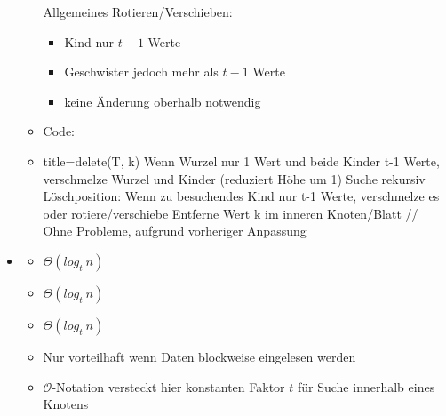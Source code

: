 \documentclass[
    12pt,
    a4paper,
    ngerman,
    color=3b,%
    marginpar=false,
    colorback=false,
    leqno,
]{tudaexercise}
\begin{document}
\begin{itemize}
\begin{itemize}
\begin{minipage}{0.25\textwidth}
                    \end{minipage}
                    \begin{minipage}{0.65\textwidth}
                        Allgemeines Rotieren/Verschieben:
                        \begin{itemize}
                            \item Kind nur $t-1$ Werte
                            \item Geschwister jedoch mehr als $t-1$ Werte
                            \item keine Änderung oberhalb notwendig
                        \end{itemize}
                    \end{minipage}
                \clearpage
                    \item Code:
                \item[]
                    \begin{ccode}[autogobble]{title={delete(T, k)}}
                    Wenn Wurzel nur 1 Wert und beide Kinder t-1 Werte, 
                    verschmelze Wurzel und Kinder (reduziert Höhe um 1)
                    Suche rekursiv Löschposition:
                        Wenn zu besuchendes Kind nur t-1 Werte, 
                        verschmelze es oder rotiere/verschiebe
                    Entferne Wert k im inneren Knoten/Blatt             
                    // Ohne Probleme, aufgrund vorheriger Anpassung
                    \end{ccode}
            \end{itemize}

        \item {}
            \begin{itemize}
                \item {} $\Theta(log_t~n)$
                \item {} $\Theta(log_t~n)$
                \item {} $\Theta(log_t~n)$
                \item Nur vorteilhaft wenn Daten blockweise eingelesen werden
                \item $\mathcal{O}$-Notation versteckt hier konstanten Faktor $t$ für Suche innerhalb eines Knotens
            \end{itemize}
    \end{itemize}
    \clearpage
\end{document}
